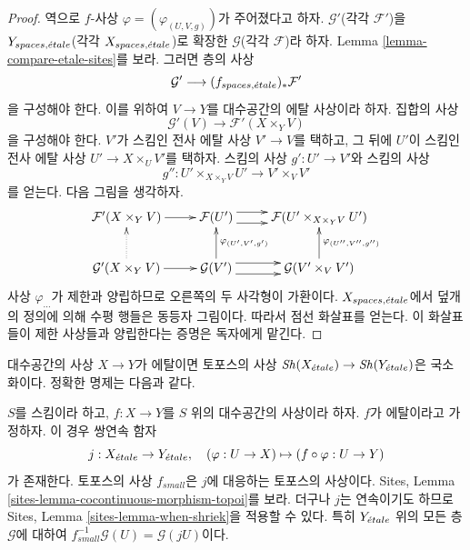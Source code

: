 \begin{proof}
\medskip\noindent
역으로 $f$-사상 $\varphi = (\varphi_{(U, V, g)})$가 주어졌다고 하자.
$\mathcal{G}'$(각각 $\mathcal{F}'$)을
$Y_{spaces, {\acute{e}tale}}$(각각 $X_{spaces, {\acute{e}tale}}$)로 확장한
$\mathcal{G}$(각각 $\mathcal{F}$)라 하자. Lemma
\ref{lemma-compare-etale-sites}를 보라.
그러면 층의 사상
$$
\mathcal{G}' \longrightarrow (f_{spaces, {\acute{e}tale}})_*\mathcal{F}'
$$
을 구성해야 한다. 이를 위하여 $V \to Y$를 대수공간의 에탈
사상이라 하자. 집합의 사상
$$
\mathcal{G}'(V) \to \mathcal{F}'(X \times_Y V)
$$
을 구성해야 한다. $V'$가 스킴인 전사 에탈 사상
$V' \to V$를 택하고, 그 뒤에 $U'$이 스킴인 전사 에탈 사상
$U' \to X \times_U V'$를 택하자. 스킴의 사상
$g' : U' \to V'$와 스킴의 사상
$$
g'' : U' \times_{X \times_Y V} U' \longrightarrow V' \times_V V'
$$
를 얻는다. 다음 그림을 생각하자.
$$
\xymatrix{
\mathcal{F}'(X \times_Y V) \ar[r] &
\mathcal{F}(U') \ar@<1ex>[r] \ar@<-1ex>[r] &
\mathcal{F}(U' \times_{X \times_Y V} U') \\
\mathcal{G}'(X \times_Y V) \ar[r] \ar@{..>}[u] &
\mathcal{G}(V') \ar@<1ex>[r] \ar@<-1ex>[r] \ar[u]_{\varphi_{(U', V', g')}} &
\mathcal{G}(V' \times_V V') \ar[u]_{\varphi_{(U'', V'', g'')}}
}
$$
사상 $\varphi_{...}$가 제한과 양립하므로 오른쪽의 두 사각형이
가환이다. $X_{spaces, {\acute{e}tale}}$에서 덮개의 정의에 의해 수평 행들은
동등자 그림이다. 따라서 점선 화살표를 얻는다.
이 화살표들이 제한 사상들과 양립한다는 증명은 독자에게 맡긴다.
\end{proof}

\noindent
대수공간의 사상 $X \to Y$가 에탈이면 토포스의 사상
$\mathop{\mathit{Sh}}\nolimits(X_{\acute{e}tale}) \to \mathop{\mathit{Sh}}\nolimits(Y_{\acute{e}tale})$은 국소화이다.
정확한 명제는 다음과 같다.

\begin{lemma}
\label{lemma-etale-morphism-topoi}
$S$를 스킴이라 하고, $f : X \to Y$를 $S$ 위의 대수공간의
사상이라 하자. $f$가 에탈이라고 가정하자. 이 경우 쌍연속 함자
$$
j : X_{\acute{e}tale} \to Y_{\acute{e}tale}, \quad
(\varphi : U \to X) \mapsto (f \circ \varphi : U \to Y)
$$
가 존재한다. 토포스의 사상 $f_{small}$은 $j$에 대응하는 토포스의
사상이다. Sites, Lemma
\ref{sites-lemma-cocontinuous-morphism-topoi}를 보라.
더구나 $j$는 연속이기도 하므로 Sites, Lemma
\ref{sites-lemma-when-shriek}을 적용할 수 있다.
특히 $Y_{\acute{e}tale}$ 위의 모든 층 $\mathcal{G}$에 대하여
$f_{small}^{-1}\mathcal{G}(U) = \mathcal{G}(jU)$이다.
\end{lemma}

